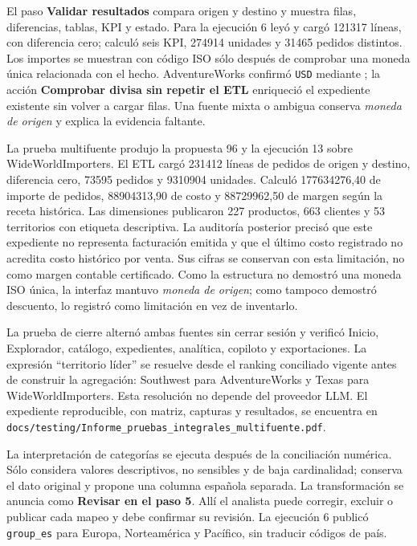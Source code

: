 \documentclass[11pt,letterpaper]{article}
\newcommand{\file}[1]{\texttt{#1}}
\begin{document}
El paso \textbf{Validar resultados} compara origen y destino y muestra filas, diferencias, tablas, KPI y estado. Para la ejecución 6 leyó y cargó 121317 líneas, con diferencia cero; calculó seis KPI, 274914 unidades y 31465 pedidos distintos. Los importes se muestran con código ISO sólo después de comprobar una moneda única relacionada con el hecho. AdventureWorks confirmó \file{USD} mediante ; la acción \textbf{Comprobar divisa sin repetir el ETL} enriqueció el expediente existente sin volver a cargar filas. Una fuente mixta o ambigua conserva \textit{moneda de origen} y explica la evidencia faltante.

La prueba multifuente produjo la propuesta 96 y la ejecución 13 sobre WideWorldImporters. El ETL cargó 231412 líneas de pedidos de origen y destino, diferencia cero, 73595 pedidos y 9310904 unidades. Calculó 177634276,40 de importe de pedidos, 88904313,90 de costo y 88729962,50 de margen según la receta histórica. Las dimensiones publicaron 227 productos, 663 clientes y 53 territorios con etiqueta descriptiva. La auditoría posterior precisó que este expediente no representa facturación emitida y que el último costo registrado no acredita costo histórico por venta. Sus cifras se conservan con esta limitación, no como margen contable certificado. Como la estructura no demostró una moneda ISO única, la interfaz mantuvo \textit{moneda de origen}; como tampoco demostró descuento, lo registró como limitación en vez de inventarlo.

La prueba de cierre alternó ambas fuentes sin cerrar sesión y verificó Inicio, Explorador,
catálogo, expedientes, analítica, copiloto y exportaciones. La expresión ``territorio
líder'' se resuelve desde el ranking conciliado vigente antes de construir la agregación:
Southwest para AdventureWorks y Texas para WideWorldImporters. Esta resolución no depende
del proveedor LLM. El expediente reproducible, con matriz, capturas y resultados, se
encuentra en \file{docs/testing/Informe\_pruebas\_integrales\_multifuente.pdf}.

La interpretación de categorías se ejecuta después de la conciliación numérica. Sólo considera valores descriptivos, no sensibles y de baja cardinalidad; conserva el dato original y propone una columna española separada. La transformación se anuncia como \textbf{Revisar en el paso 5}. Allí el analista puede corregir, excluir o publicar cada mapeo y debe confirmar su revisión. La ejecución 6 publicó \file{group\_es} para Europa, Norteamérica y Pacífico, sin traducir códigos de país.
\end{document}
